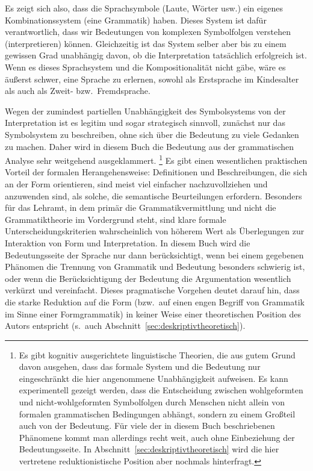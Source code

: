 \begin{exe}
  \ex\label{ex:dg7718}
  \begin{xlist}
  \end{xlist}
\end{exe}

Es zeigt sich also, dass die Sprachsymbole (Laute, Wörter usw.) ein eigenes Kombinationssystem (eine Grammatik) haben.
Dieses System ist dafür verantwortlich, dass wir Bedeutungen von komplexen Symbolfolgen verstehen (interpretieren) können.
Gleichzeitig ist das System selber aber bis zu einem gewissen Grad unabhängig davon, ob die Interpretation tatsächlich erfolgreich ist.
Wenn es dieses Sprachsystem und die Kompositionalität nicht gäbe, wäre es äußerst schwer, eine Sprache zu erlernen, sowohl als Erstsprache im Kindesalter als auch als Zweit- bzw.\ Fremdsprache.

Wegen der zumindest partiellen Unabhängigkeit des Symbolsystems von der Interpretation ist es legitim und sogar strategisch sinnvoll, zunächst nur das Symbolsystem zu beschreiben, ohne sich über die Bedeutung zu viele Gedanken zu machen.
Daher wird in diesem Buch die Bedeutung aus der grammatischen Analyse sehr weitgehend ausgeklammert.%
\footnote{Es gibt kognitiv ausgerichtete linguistische Theorien, die aus gutem Grund davon ausgehen, dass das formale System und die Bedeutung nur eingeschränkt die hier angenommene Unabhängigkeit aufweisen.
Es kann \zB experimentell gezeigt werden, dass die Entscheidung zwischen wohlgeformten und nicht-wohlgeformten Symbolfolgen durch Menschen nicht allein von formalen grammatischen Bedingungen abhängt, sondern zu einem Großteil auch von der Bedeutung.
Für viele der in diesem Buch beschriebenen Phänomene kommt man allerdings recht weit, auch ohne Einbeziehung der Bedeutungsseite.
In Abschnitt~\ref{sec:deskriptivtheoretisch} wird die hier vertretene reduktionistische Position aber nochmals hinterfragt.}
Es gibt einen wesentlichen praktischen Vorteil der formalen Herangehensweise:
Definitionen und Beschreibungen, die sich an der Form orientieren, sind meist viel einfacher nachzuvollziehen und anzuwenden sind, als solche, die semantische Beurteilungen erfordern.
Besonders für das Lehramt, in dem primär die Grammatikvermittlung und nicht die Grammatiktheorie im Vordergrund steht, sind klare formale Unterscheidungskriterien wahrscheinlich von höherem Wert als Überlegungen zur Interaktion von Form und Interpretation.
In diesem Buch wird die Bedeutungsseite der Sprache nur dann berücksichtigt, wenn bei einem gegebenen Phänomen die Trennung von Grammatik und Bedeutung besonders schwierig ist, oder wenn die Berücksichtigung der Bedeutung die Argumentation wesentlich verkürzt und vereinfacht.
Dieses pragmatische Vorgehen deutet darauf hin, dass die starke Reduktion auf die Form (bzw.\ auf einen engen Begriff von Grammatik im Sinne einer Formgrammatik) in keiner Weise einer theoretischen Position des Autors entspricht (s.\ auch Abschnitt~\ref{sec:deskriptivtheoretisch}).


